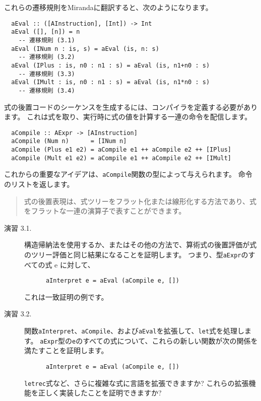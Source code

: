 \documentclass{jarticle}
\begin{document}
これらの遷移規則をMirandaに翻訳すると、次のようになります。

\begin{verbatim}
  aEval :: ([AInstruction], [Int]) -> Int
  aEval ([], [n]) = n
    -- 遷移規則 (3.1)
  aEval (INum n : is, s) = aEval (is, n: s)
    -- 遷移規則 (3.2)
  aEval (IPlus : is, n0 : n1 : s) = aEval (is, n1+n0 : s)
    -- 遷移規則 (3.3)
  aEval (IMult : is, n0 : n1 : s) = aEval (is, n1*n0 : s)
    -- 遷移規則 (3.4)
\end{verbatim}

式の後置コードのシーケンスを生成するには、コンパイラを定義する必要があります。
これは式を取り、実行時に式の値を計算する一連の命令を配信します。

\begin{verbatim}
  aCompile :: AExpr -> [AInstruction]
  aCompile (Num n)      = [INum n]
  aCompile (Plus e1 e2) = aCompile e1 ++ aCompile e2 ++ [IPlus]
  aCompile (Mult e1 e2) = aCompile e1 ++ aCompile e2 ++ [IMult]
\end{verbatim}

これからの重要なアイデアは、\texttt{aCompile}関数の型によって与えられます。
命令のリストを返します。

\begin{quotation}
	式の後置表現は、式ツリーをフラット化または線形化する方法であり、式をフラットな一連の演算子で表すことができます。
\end{quotation}

\begin{description}
	\item[演習 3.1.] 構造帰納法を使用するか、またはその他の方法で、算術式の後置評価が式のツリー評価と同じ結果になることを証明します。
	      つまり、型\texttt{aExpr}のすべての式 e に対して、
	      \begin{verbatim}
      aInterpret e = aEval (aCompile e, [])
    \end{verbatim}
	      これは一致証明の例です。
	\item[演習 3.2.] 関数\texttt{aInterpret}、\texttt{aCompile}、および\texttt{aEval}を拡張して、\texttt{let}式を処理します。
	      \texttt{aExpr}型の\texttt{e}のすべての式について、これらの新しい関数が次の関係を満たすことを証明します。
	      \begin{verbatim}
      aInterpret e = aEval (aCompile e, [])
    \end{verbatim}
	      \texttt{letrec}式など、さらに複雑な式に言語を拡張できますか?
	      これらの拡張機能を正しく実装したことを証明できますか?
\end{description}
\end{document}
